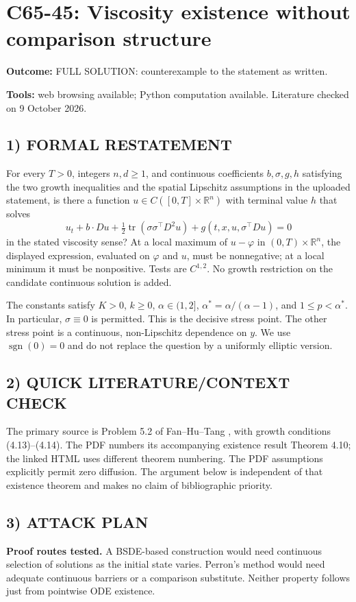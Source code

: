 \documentclass[11pt,a4paper]{article}
\newcommand{\R}{\mathbb R}
\newcommand{\sgn}{\operatorname{sgn}}
\theoremstyle{definition}
\begin{document}
\section*{C65-45: Viscosity existence without comparison structure}
\textbf{Outcome:} FULL SOLUTION: counterexample to the statement as written.\par\textbf{Tools:} web browsing available; Python computation available. Literature checked on 9 October 2026.
\subsection*{1) FORMAL RESTATEMENT}
For every $T>0$, integers $n,d\ge1$, and continuous coefficients $b,\sigma,g,h$ satisfying the two growth inequalities and the spatial Lipschitz assumptions in the uploaded statement, is there a function $u\in C([0,T]\times\R^n)$ with terminal value $h$ that solves
\[
 u_t+b\cdot Du+\tfrac12\operatorname{tr}(\sigma\sigma^\top D^2u)
       +g(t,x,u,\sigma^\top Du)=0
\]
in the stated viscosity sense? At a local maximum of $u-\varphi$ in $(0,T)\times\R^n$, the displayed expression, evaluated on $\varphi$ and $u$, must be nonnegative; at a local minimum it must be nonpositive. Tests are $C^{1,2}$. No growth restriction on the candidate continuous solution is added.

The constants satisfy $K>0$, $k\ge0$, $\alpha\in(1,2]$, $\alpha^*=\alpha/(\alpha-1)$, and $1\le p<\alpha^*$. In particular, $\sigma\equiv0$ is permitted. This is the decisive stress point. The other stress point is a continuous, non-Lipschitz dependence on $y$. We use $\sgn(0)=0$ and do not replace the question by a uniformly elliptic version.

\subsection*{2) QUICK LITERATURE/CONTEXT CHECK}
The primary source is Problem 5.2 of Fan--Hu--Tang \cite{FHT}, with growth conditions (4.13)--(4.14). The PDF numbers its accompanying existence result Theorem 4.10; the linked HTML uses different theorem numbering. The PDF assumptions explicitly permit zero diffusion. The argument below is independent of that existence theorem and makes no claim of bibliographic priority.

\subsection*{3) ATTACK PLAN}
\textbf{Proof routes tested.} A BSDE-based construction would need continuous selection of solutions as the initial state varies. Perron's method would need adequate continuous barriers or a comparison substitute. Neither property follows just from pointwise ODE existence.
\end{document}
